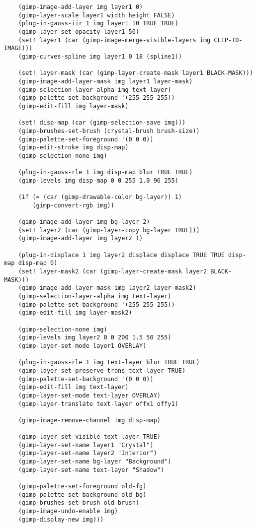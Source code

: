 \documentclass{article}
\begin{document}
{\begin{verbatim}
    (gimp-image-add-layer img layer1 0)
    (gimp-layer-scale layer1 width height FALSE)
    (plug-in-gauss-iir 1 img layer1 10 TRUE TRUE)
    (gimp-layer-set-opacity layer1 50)
    (set! layer1 (car (gimp-image-merge-visible-layers img CLIP-TO-IMAGE)))
    (gimp-curves-spline img layer1 0 18 (spline1))

    (set! layer-mask (car (gimp-layer-create-mask layer1 BLACK-MASK)))
    (gimp-image-add-layer-mask img layer1 layer-mask)
    (gimp-selection-layer-alpha img text-layer)
    (gimp-palette-set-background '(255 255 255))
    (gimp-edit-fill img layer-mask)

    (set! disp-map (car (gimp-selection-save img)))
    (gimp-brushes-set-brush (crystal-brush brush-size))
    (gimp-palette-set-foreground '(0 0 0))
    (gimp-edit-stroke img disp-map)
    (gimp-selection-none img)

    (plug-in-gauss-rle 1 img disp-map blur TRUE TRUE)
    (gimp-levels img disp-map 0 0 255 1.0 96 255)

    (if (= (car (gimp-drawable-color bg-layer)) 1)
        (gimp-convert-rgb img))

    (gimp-image-add-layer img bg-layer 2)
    (set! layer2 (car (gimp-layer-copy bg-layer TRUE)))
    (gimp-image-add-layer img layer2 1)

    (plug-in-displace 1 img layer2 displace displace TRUE TRUE disp-map disp-map 0)
    (set! layer-mask2 (car (gimp-layer-create-mask layer2 BLACK-MASK)))
    (gimp-image-add-layer-mask img layer2 layer-mask2)
    (gimp-selection-layer-alpha img text-layer)
    (gimp-palette-set-background '(255 255 255))
    (gimp-edit-fill img layer-mask2)

    (gimp-selection-none img)
    (gimp-levels img layer2 0 0 200 1.5 50 255)
    (gimp-layer-set-mode layer1 OVERLAY)

    (plug-in-gauss-rle 1 img text-layer blur TRUE TRUE)
    (gimp-layer-set-preserve-trans text-layer TRUE)
    (gimp-palette-set-background '(0 0 0))
    (gimp-edit-fill img text-layer)
    (gimp-layer-set-mode text-layer OVERLAY)
    (gimp-layer-translate text-layer offx1 offy1)

    (gimp-image-remove-channel img disp-map)

    (gimp-layer-set-visible text-layer TRUE)
    (gimp-layer-set-name layer1 "Crystal")
    (gimp-layer-set-name layer2 "Interior")
    (gimp-layer-set-name bg-layer "Background")
    (gimp-layer-set-name text-layer "Shadow")

    (gimp-palette-set-foreground old-fg)
    (gimp-palette-set-background old-bg)
    (gimp-brushes-set-brush old-brush)
    (gimp-image-undo-enable img)
    (gimp-display-new img)))
\end{verbatim}}
\twocolumn
\end{document}
